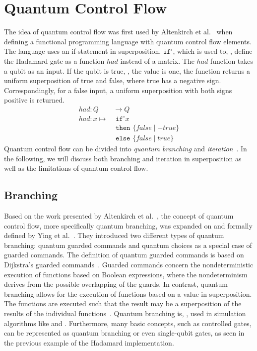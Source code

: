 \section{Quantum Control Flow}
\label{sec:background_quantumControlFlow}
The idea of quantum control flow was first used by Altenkirch et al.~\cite{AlGr05} when defining a functional programming language with quantum control flow elements. The language uses an if-statement in superposition, $\texttt{if}^\circ$, which is used to, \eg, define the Hadamard gate as a function $had$ instead of a matrix. The $had$ function takes a qubit as an input. If the qubit is true, \ie, the value is one, the function returns a uniform superposition of true and false, where true has a negative sign. Correspondingly, for a false input, a uniform superposition with both signs positive is returned.
\begin{align*}
    had : Q& \to Q\\
    had : x \mapsto& \texttt{ if}^\circ x\\
                   & \texttt{ then } \{false \mid -true\}\\
                   & \texttt{ else } \{false \mid true\}
\end{align*}
Quantum control flow can be divided into \emph{quantum branching} and \emph{iteration}~\cite{YVC24}. In the following, we will discuss both branching and iteration in superposition as well as the limitations of quantum control flow. 

\subsection{Branching}
\label{sec:background_branching}
Based on the work presented by Altenkirch et al.~\cite{AlGr05}, the concept of quantum control flow, more specifically quantum branching, was expanded on and formally defined by Ying et al.~\cite{YYF12}. They introduced two different types of quantum branching: quantum guarded commands and quantum choices as a special case of guarded commands. The definition of quantum guarded commands is based on Dijkstra's guarded commands~\cite{Dijk75}. Guarded commands concern the nondeterministic execution of functions based on Boolean expressions, where the nondeterminism derives from the possible overlapping of the guards. In contrast, quantum branching allows for the execution of functions based on a value in superposition. The functions are executed such that the result may be a superposition of the results of the individual functions~\cite{YVC24}.
Quantum branching is, \eg, used in simulation algorithms like \cite{BGB*18} and \cite{LoCh19}. Furthermore, many basic concepts, such as controlled gates, can be represented as quantum branching or even single-qubit gates, as seen in the previous example of the Hadamard implementation.

